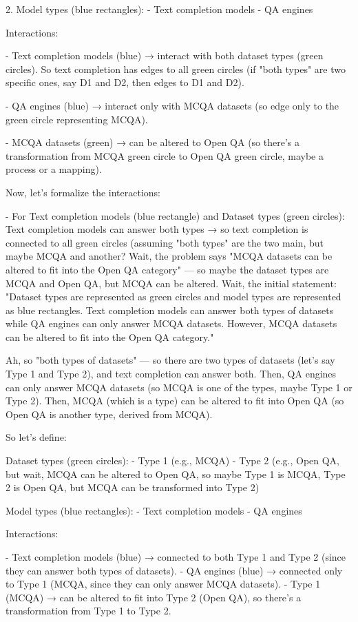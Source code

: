 2. Model types (blue rectangles):
   - Text completion models
   - QA engines

Interactions:

- Text completion models (blue) → interact with both dataset types (green circles). So text completion has edges to all green circles (if "both types" are two specific ones, say D1 and D2, then edges to D1 and D2).

- QA engines (blue) → interact only with MCQA datasets (so edge only to the green circle representing MCQA).

- MCQA datasets (green) → can be altered to Open QA (so there's a transformation from MCQA green circle to Open QA green circle, maybe a process or a mapping).

Now, let's formalize the interactions:

- For Text completion models (blue rectangle) and Dataset types (green circles):
  Text completion models can answer both types → so text completion is connected to all green circles (assuming "both types" are the two main, but maybe MCQA and another? Wait, the problem says "MCQA datasets can be altered to fit into the Open QA category" — so maybe the dataset types are MCQA and Open QA, but MCQA can be altered. Wait, the initial statement: "Dataset types are represented as green circles and model types are represented as blue rectangles. Text completion models can answer both types of datasets while QA engines can only answer MCQA datasets. However, MCQA datasets can be altered to fit into the Open QA category."

Ah, so "both types of datasets" — so there are two types of datasets (let's say Type 1 and Type 2), and text completion can answer both. Then, QA engines can only answer MCQA datasets (so MCQA is one of the types, maybe Type 1 or Type 2). Then, MCQA (which is a type) can be altered to fit into Open QA (so Open QA is another type, derived from MCQA).

So let's define:

Dataset types (green circles):
- Type 1 (e.g., MCQA)
- Type 2 (e.g., Open QA, but wait, MCQA can be altered to Open QA, so maybe Type 1 is MCQA, Type 2 is Open QA, but MCQA can be transformed into Type 2)

Model types (blue rectangles):
- Text completion models
- QA engines

Interactions:

- Text completion models (blue) → connected to both Type 1 and Type 2 (since they can answer both types of datasets).
- QA engines (blue) → connected only to Type 1 (MCQA, since they can only answer MCQA datasets).
- Type 1 (MCQA) → can be altered to fit into Type 2 (Open QA), so there's a transformation from Type 1 to Type 2.

